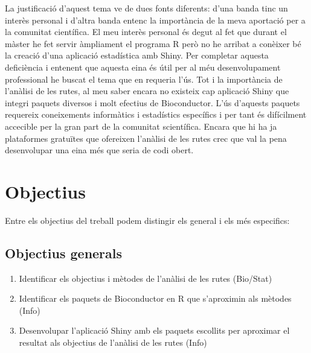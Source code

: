 La justificació d'aquest tema ve de dues fonts diferents: d'una banda tinc un interès personal i d'altra banda entenc la importància de la meva aportació per a la comunitat científica. El meu interès personal és degut al fet que durant el màster he fet servir àmpliament el programa R però no he arribat a conèixer bé la creació d'una aplicació estadística amb Shiny. Per completar aquesta deficiència i entenent que aquesta eina és útil per al méu desenvolupament professional he buscat el tema que en requeria l'ús. Tot i la importància de l'anàlisi de les rutes, al meu saber encara no existeix cap aplicació Shiny que integri paquets diversos i molt efectius de Bioconductor. L'ús d'aquests paquets requereix coneixements informàtics i estadístics específics i per tant és difícilment accecible per la gran part de la comunitat scientífica. Encara que hi ha ja plataformes gratuïtes que ofereixen l'anàlisi de les rutes \cite{reimand2019pathway} crec que val la pena desenvolupar una eina més que seria de codi obert.



\section{Objectius}

Entre els objectius del treball podem distingir els general i els més especifics:
 
\subsection{Objectius generals}
\begin{enumerate}
\item Identificar els objectius i mètodes de l'anàlisi de les rutes (Bio/Stat)
\item Identificar els paquets de Bioconductor en R que s'aproximin als mètodes (Info)
\item Desenvolupar l'aplicació Shiny  amb els paquets escollits per aproximar el resultat als objectius de l'anàlisi de les rutes  (Info)
\end{enumerate}

